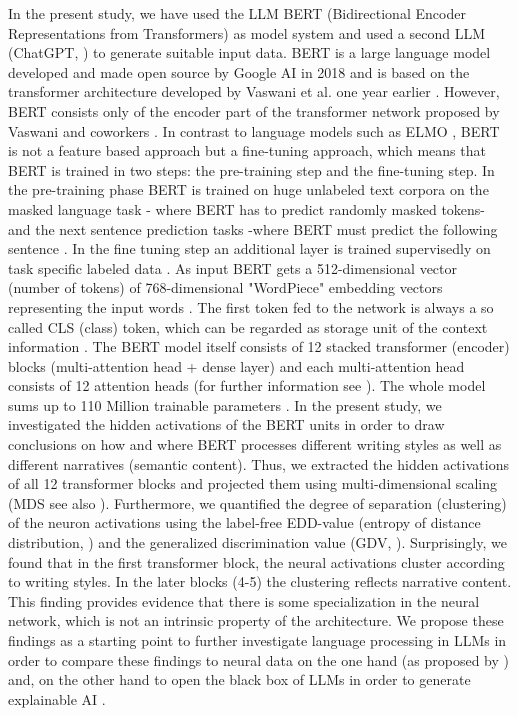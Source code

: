 In the present study, we have used the LLM BERT (Bidirectional Encoder Representations from Transformers)  \cite{devlin2018bert} as model system and used a second LLM (ChatGPT, \cite{brown2020language}) to generate suitable input data. BERT is a large language model developed and made open source by Google AI in 2018 and is based on the transformer architecture developed by Vaswani et al. one year earlier \cite{vaswani2017attention}. However, BERT consists only of the encoder part of the transformer network proposed by Vaswani and coworkers \cite{vaswani2017attention, devlin2018bert}.
In contrast to language models such as ELMO \cite{peters2018deep}, BERT is not a feature based approach but a fine-tuning approach, which means that BERT is trained in two steps: the pre-training step and the fine-tuning step. In the pre-training phase BERT is trained on huge unlabeled text corpora on the masked language task - where BERT has to predict randomly masked tokens- and the next sentence prediction tasks -where BERT must predict the following sentence \cite{devlin2018bert}. In the fine tuning step an additional layer is trained supervisedly on task specific labeled data \cite{devlin2018bert}. As input BERT gets a 512-dimensional vector (number of tokens) of 768-dimensional "WordPiece" embedding vectors \cite{wu2016google} representing the input words \cite{devlin2018bert}. The first token fed to the network is always a so called CLS (class) token, which can be regarded as storage unit of the context information \cite{devlin2018bert}. 
The BERT model itself consists of 12 stacked transformer (encoder) blocks (multi-attention head + dense layer) and each multi-attention head consists of 12 attention heads (for further information see \cite{devlin2018bert}). The whole model sums up to 110 Million trainable parameters \cite{devlin2018bert}.
In the present study, we investigated the hidden activations of the BERT units in order to draw conclusions on how and where BERT processes different writing styles as well as different narratives (semantic content). Thus, we extracted the hidden activations of all 12 transformer blocks and projected them using multi-dimensional scaling (MDS see also \cite{schilling2021quantifying, krauss2021analysis, krauss2018statistical}). Furthermore, we quantified the degree of separation (clustering) of the neuron activations using the label-free EDD-value (entropy of distance distribution, \cite{metzner2023beyond}) and the generalized discrimination value (GDV, \cite{schilling2021quantifying, metzner2023beyond, metzner2022classification, metzner2021sleep, schilling2022deep, traxdorf2019microstructure}). Surprisingly, we found that in the first transformer block, the neural activations cluster according to writing styles. In the later blocks (4-5) the clustering reflects narrative content. This finding provides evidence that there is some specialization in the neural network, which is not an intrinsic property of the architecture. We propose these findings as a starting point to further investigate language processing in LLMs in order to compare these findings to neural data on the one hand (as proposed by \cite{kriegeskorte2018cognitive}) and, on the other hand to open the black box of LLMs in order to generate explainable AI \cite{castelvecchi2016can}.  

